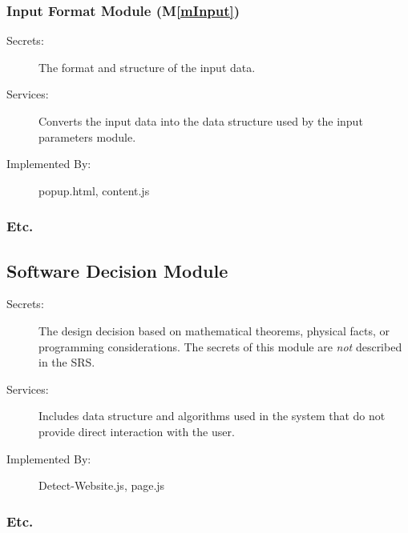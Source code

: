 \documentclass[12pt, titlepage]{article}
\newcommand{\mref}[1]{M\ref{#1}}
\begin{document}
\subsubsection{Input Format Module (\mref{mInput})}
\begin{description}
\item[Secrets:]The format and structure of the input data.
\item[Services:]Converts the input data into the data structure used by the
  input parameters module.
\item[Implemented By:] popup.html, content.js
\end{description}
\subsubsection{Etc.}
\subsection{Software Decision Module}
\begin{description}
\item[Secrets:] The design decision based on mathematical theorems, physical
  facts, or programming considerations. The secrets of this module are
  \emph{not} described in the SRS.
\item[Services:] Includes data structure and algorithms used in the system that
  do not provide direct interaction with the user. 
\item[Implemented By:] Detect-Website.js, page.js
\end{description}
\subsubsection{Etc.}
\end{document}
